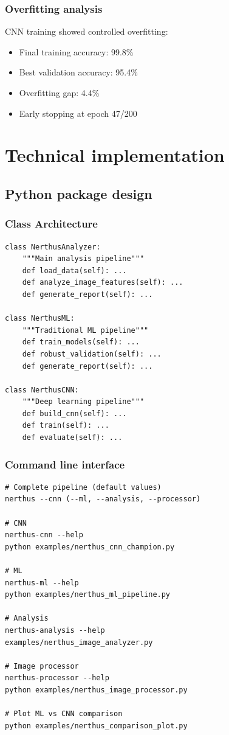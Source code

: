 \documentclass[11pt]{article}
\begin{document}
\subsubsection{Overfitting analysis}
CNN training showed controlled overfitting:
\begin{itemize}
    \item Final training accuracy: 99.8\%
    \item Best validation accuracy: 95.4\%
    \item Overfitting gap: 4.4\%
    \item Early stopping at epoch 47/200
\end{itemize}

\section{Technical implementation}

\subsection{Python package design}

\subsubsection{Class Architecture}
\begin{lstlisting}
class NerthusAnalyzer:
    """Main analysis pipeline"""
    def load_data(self): ...
    def analyze_image_features(self): ...
    def generate_report(self): ...

class NerthusML:
    """Traditional ML pipeline""" 
    def train_models(self): ...
    def robust_validation(self): ...
    def generate_report(self): ...

class NerthusCNN:
    """Deep learning pipeline"""
    def build_cnn(self): ...
    def train(self): ...
    def evaluate(self): ...
\end{lstlisting}

\subsubsection{Command line interface}
\begin{lstlisting}
# Complete pipeline (default values)
nerthus --cnn (--ml, --analysis, --processor)

# CNN
nerthus-cnn --help
python examples/nerthus_cnn_champion.py

# ML
nerthus-ml --help
python examples/nerthus_ml_pipeline.py

# Analysis
nerthus-analysis --help
examples/nerthus_image_analyzer.py

# Image processor
nerthus-processor --help
python examples/nerthus_image_processor.py

# Plot ML vs CNN comparison
python examples/nerthus_comparison_plot.py
\end{lstlisting}
\end{document}
